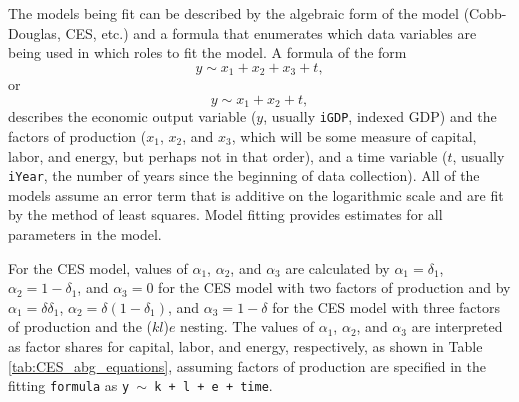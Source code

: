 \documentclass[preprint,authoryear,12pt]{elsarticle}\usepackage[]{graphicx}\usepackage[]{color}
\begin{document}
The models being fit can be described by the algebraic form of the model 
(Cobb-Douglas, CES, etc.) and a formula that enumerates 
which data variables are being used in which roles to fit the model.  
A formula of the form
%
\begin{equation} \label{eq:formulas-3-factor}
y \sim x_1 + x_2 + x_3 + t,
\end{equation}
%
or 
%
\begin{equation} \label{eq:formulas-2-factor}
y \sim x_1 + x_2 + t,
\end{equation}
%
describes the economic output variable ($y$, usually \texttt{iGDP},
                                        indexed GDP) 
and the factors of production ($x_1$, $x_2$, and $x_3$,
                               which will be some measure of capital, labor, and energy, 
                               but perhaps not in that order), 
and a time variable ($t$, usually \texttt{iYear}, 
                     the number of years since the beginning of data collection).  
All of the models assume an error term that is additive on the 
logarithmic scale and are fit by the method of least squares.  
Model fitting provides estimates for all parameters in the model.

For the CES model, values of $\alpha_1$, $\alpha_2$, and $\alpha_3$ are calculated by
$\alpha_1 = \delta_1$, $\alpha_2 = 1 - \delta_1$, and $\alpha_3 = 0$ 
for the CES model with two factors of production
and by 
$\alpha_1 = \delta \delta_1$, $\alpha_2 = \delta(1 - \delta_1)$, and $\alpha_3 = 1 - \delta$
for the CES model with three factors of production and the ($kl$)$e$ nesting.
The values of $\alpha_1$, $\alpha_2$, and $\alpha_3$ are interpreted as
factor shares for capital, labor, and energy, respectively,
as shown in Table \ref{tab:CES_abg_equations}, 
assuming factors of production are specified in the fitting \texttt{formula} as
\texttt{y~$\sim$~k~+~l~+~e~+~time}.
\end{document}

